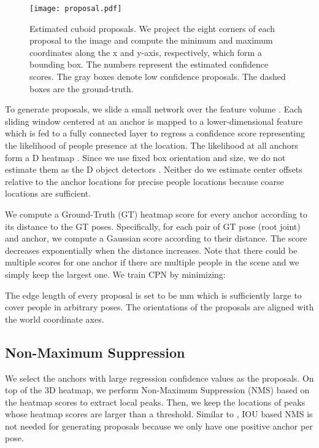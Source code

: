\documentclass[runningheads]{llncs}
\begin{document}
\begin{figure*}
	\centering
	\texttt{[image: proposal.pdf]}
	\caption{Estimated cuboid proposals. We project the eight corners of each proposal to the image and compute the minimum and maximum coordinates along the x and y-axis, respectively, which form a bounding box. The numbers represent the estimated confidence scores. The gray boxes denote low confidence proposals. The dashed boxes are the ground-truth.
	}
	\label{fig:proposal}
\end{figure*}


To generate proposals, we slide a small network over the feature volume . Each sliding window centered at an anchor is mapped to a lower-dimensional feature which is fed to a fully connected layer to regress a confidence score  representing the likelihood of people presence at the location. The likelihood at all anchors form a D heatmap . Since we use fixed box orientation and size, we do not estimate them as the D object detectors \cite{ren2015faster,redmon2018yolov3}. Neither do we estimate center offsets relative to the anchor locations for precise people locations because coarse locations are sufficient.

We compute a Ground-Truth (GT) heatmap score  for every anchor according to its distance to the GT poses. Specifically, for each pair of GT pose (root joint) and anchor, we compute a Gaussian score according to their distance. The score decreases exponentially when the distance increases. Note that there could be multiple scores for one anchor if there are multiple people in the scene and we simply keep the largest one. We train CPN by minimizing:

The edge length of every proposal is set to be mm which is sufficiently large to cover people in arbitrary poses. The orientations of the proposals are aligned with the world coordinate axes.



\subsection{Non-Maximum Suppression}

 We select the anchors with large regression confidence values as the proposals. On top of the 3D heatmap, we perform Non-Maximum Suppression (NMS) based on the heatmap scores to extract local peaks. Then, we keep the locations of peaks whose heatmap scores are larger than a threshold. Similar to \cite{zhou2019objects}, IOU based NMS is not needed for generating proposals because we only have one positive anchor per pose.
\end{document}
